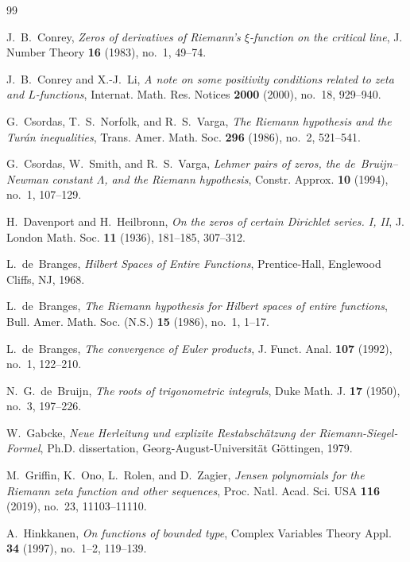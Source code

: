 \documentclass[11pt,reqno]{amsart}
\theoremstyle{definition}
\theoremstyle{remark}
\numberwithin{equation}{section}
\begin{document}
\begin{thebibliography}{99}

J.~B.~Conrey,
\emph{Zeros of derivatives of Riemann's $\xi$-function on the critical line},
J. Number Theory \textbf{16} (1983), no.~1, 49--74.

J.~B.~Conrey and X.-J.~Li,
\emph{A note on some positivity conditions related to zeta and $L$-functions},
Internat. Math. Res. Notices \textbf{2000} (2000), no.~18, 929--940.

G.~Csordas, T.~S.~Norfolk, and R.~S.~Varga,
\emph{The Riemann hypothesis and the Tur\'an inequalities},
Trans. Amer. Math. Soc. \textbf{296} (1986), no.~2, 521--541.

G.~Csordas, W.~Smith, and R.~S.~Varga,
\emph{Lehmer pairs of zeros, the de~Bruijn--Newman constant $\Lambda$, and the Riemann hypothesis},
Constr. Approx. \textbf{10} (1994), no.~1, 107--129.

H.~Davenport and H.~Heilbronn,
\emph{On the zeros of certain Dirichlet series. I, II},
J. London Math. Soc. \textbf{11} (1936), 181--185, 307--312.

L.~de~Branges,
\emph{Hilbert Spaces of Entire Functions},
Prentice-Hall, Englewood Cliffs, NJ, 1968.

L.~de~Branges,
\emph{The Riemann hypothesis for Hilbert spaces of entire functions},
Bull. Amer. Math. Soc. (N.S.) \textbf{15} (1986), no.~1, 1--17.

L.~de~Branges,
\emph{The convergence of Euler products},
J. Funct. Anal. \textbf{107} (1992), no.~1, 122--210.

N.~G.~de~Bruijn,
\emph{The roots of trigonometric integrals},
Duke Math. J. \textbf{17} (1950), no.~3, 197--226.

W.~Gabcke,
\emph{Neue Herleitung und explizite Restabsch\"atzung der Riemann-Siegel-Formel},
Ph.D. dissertation, Georg-August-Universit\"at G\"ottingen, 1979.

M.~Griffin, K.~Ono, L.~Rolen, and D.~Zagier,
\emph{Jensen polynomials for the Riemann zeta function and other sequences},
Proc. Natl. Acad. Sci. USA \textbf{116} (2019), no.~23, 11103--11110.

A.~Hinkkanen,
\emph{On functions of bounded type},
Complex Variables Theory Appl. \textbf{34} (1997), no.~1--2, 119--139.


\end{thebibliography}
\end{document}
